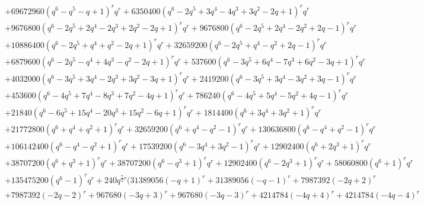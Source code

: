 \documentclass[11pt,english]{amsart}
\numberwithin{equation}{section}
\numberwithin{figure}{section}
\theoremstyle{plain}
\theoremstyle{plain}
\theoremstyle{definition}
\theoremstyle{remark}
\begin{document}
{\begin{align*}
& + 69672960  {\left(q^{6} - q^{5} - q + 1\right)}^{r} q^{r} + 6350400  {\left(q^{6} - 2  q^{5} + 3  q^{4} - 4  q^{3} + 3  q^{2} - 2  q + 1\right)}^{r} q^{r} \\
& + 9676800  {\left(q^{6} - 2  q^{5} + 2  q^{4} - 2  q^{3} + 2  q^{2} - 2  q + 1\right)}^{r} q^{r} + 9676800  {\left(q^{6} - 2  q^{5} + 2  q^{4} - 2  q^{2} + 2  q - 1\right)}^{r} q^{r} \\
& + 10886400  {\left(q^{6} - 2  q^{5} + q^{4} + q^{2} - 2  q + 1\right)}^{r} q^{r} + 32659200  {\left(q^{6} - 2  q^{5} + q^{4} - q^{2} + 2  q - 1\right)}^{r} q^{r} \\
& + 6879600  {\left(q^{6} - 2  q^{5} - q^{4} + 4  q^{3} - q^{2} - 2  q + 1\right)}^{r} q^{r} + 537600  {\left(q^{6} - 3  q^{5} + 6  q^{4} - 7  q^{3} + 6  q^{2} - 3  q + 1\right)}^{r} q^{r} \\
& + 4032000  {\left(q^{6} - 3  q^{5} + 3  q^{4} - 2  q^{3} + 3  q^{2} - 3  q + 1\right)}^{r} q^{r} + 2419200  {\left(q^{6} - 3  q^{5} + 3  q^{4} - 3  q^{2} + 3  q - 1\right)}^{r} q^{r} \\
& + 453600  {\left(q^{6} - 4  q^{5} + 7  q^{4} - 8  q^{3} + 7  q^{2} - 4  q + 1\right)}^{r} q^{r} + 786240  {\left(q^{6} - 4  q^{5} + 5  q^{4} - 5  q^{2} + 4  q - 1\right)}^{r} q^{r} \\
& + 21840  {\left(q^{6} - 6  q^{5} + 15  q^{4} - 20  q^{3} + 15  q^{2} - 6  q + 1\right)}^{r} q^{r} + 1814400  {\left(q^{6} + 3  q^{4} + 3  q^{2} + 1\right)}^{r} q^{r} \\
& + 21772800  {\left(q^{6} + q^{4} + q^{2} + 1\right)}^{r} q^{r} + 32659200  {\left(q^{6} + q^{4} - q^{2} - 1\right)}^{r} q^{r} + 130636800  {\left(q^{6} - q^{4} + q^{2} - 1\right)}^{r} q^{r} \\
& + 106142400  {\left(q^{6} - q^{4} - q^{2} + 1\right)}^{r} q^{r} + 17539200  {\left(q^{6} - 3  q^{4} + 3  q^{2} - 1\right)}^{r} q^{r} + 12902400  {\left(q^{6} + 2  q^{3} + 1\right)}^{r} q^{r} \\
& + 38707200  {\left(q^{6} + q^{3} + 1\right)}^{r} q^{r} + 38707200  {\left(q^{6} - q^{3} + 1\right)}^{r} q^{r} + 12902400  {\left(q^{6} - 2  q^{3} + 1\right)}^{r} q^{r} + 58060800  {\left(q^{6} + 1\right)}^{r} q^{r} \\
& + 135475200  {\left(q^{6} - 1\right)}^{r} q^{r} + 240  q^{\frac{7}{2}  r} \Biggl(31389056  {\left(-q + 1\right)}^{r} + 31389056  {\left(-q - 1\right)}^{r} + 7987392  {\left(-2  q + 2\right)}^{r} \\
& + 7987392  {\left(-2  q - 2\right)}^{r} + 967680  {\left(-3  q + 3\right)}^{r} + 967680  {\left(-3  q - 3\right)}^{r} + 4214784  {\left(-4  q + 4\right)}^{r} + 4214784  {\left(-4  q - 4\right)}^{r} \\

\end{align*}}
\end{document}
